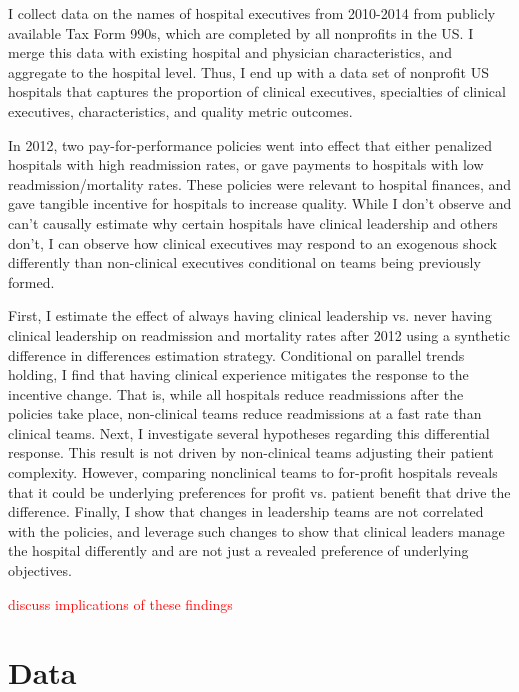 \documentclass[12pt]{article}
\begin{document}
    I collect data on the names of hospital executives from 2010-2014 from publicly available Tax Form 990s, which are completed by all nonprofits in the US. I merge this data with existing hospital and physician characteristics, and aggregate to the hospital level. Thus, I end up with a data set of nonprofit US hospitals that captures the proportion of clinical executives, specialties of clinical executives, characteristics, and quality metric outcomes. 

    In 2012, two pay-for-performance policies went into effect that either penalized hospitals with high readmission rates, or gave payments to hospitals with low readmission/mortality rates. These policies were relevant to hospital finances, and gave tangible incentive for hospitals to increase quality. While I don't observe and can't causally estimate why certain hospitals have clinical leadership and others don't, I can observe how clinical executives may respond to an exogenous shock differently than non-clinical executives conditional on teams being previously formed. 

    First, I estimate the effect of always having clinical leadership vs. never having clinical leadership on readmission and mortality rates after 2012 using a synthetic difference in differences estimation strategy. Conditional on parallel trends holding, I find that having clinical experience mitigates the response to the incentive change. That is, while all hospitals reduce readmissions after the policies take place, non-clinical teams reduce readmissions at a fast rate than clinical teams. Next, I investigate several hypotheses regarding this differential response. This result is not driven by non-clinical teams adjusting their patient complexity. However, comparing nonclinical teams to for-profit hospitals reveals that it could be underlying preferences for profit vs. patient benefit that drive the difference. Finally, I show that changes in leadership teams are not correlated with the policies, and leverage such changes to show that clinical leaders manage the hospital differently and are not just a revealed preference of underlying objectives. 

    \textcolor{red}{discuss implications of these findings}

    

	
	\newpage

    \printbibliography

\appendix

 \section{Data}\label{appendixdata}
\end{document}
